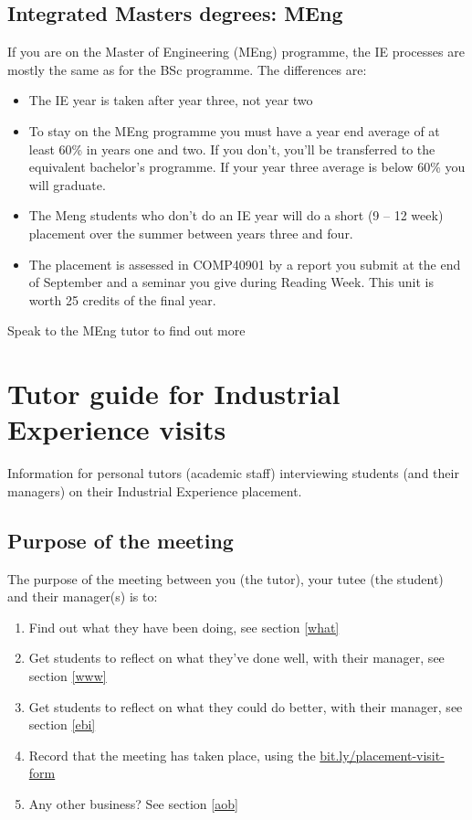 \documentclass[
]{book}
\providecommand{\tightlist}{%
  \setlength{\itemsep}{0pt}\setlength{\parskip}{0pt}}
\begin{document}
\section{Integrated Masters degrees: MEng}\label{meng}

If you are on the Master of Engineering (MEng) programme, the IE processes are mostly the same as for the BSc programme. The differences are:

\begin{itemize}
\tightlist
\item
  The IE year is taken after year three, not year two
\item
  To stay on the MEng programme you must have a year end average of at least 60\% in years one and two. If you don't, you'll be transferred to the equivalent bachelor's programme. If your year three average is below 60\% you will graduate.
\item
  The Meng students who don't do an IE year will do a short (9 -- 12 week) placement over the summer between years three and four.
\item
  The placement is assessed in COMP40901 by a report you submit at the end of September and a seminar you give during Reading Week. This unit is worth 25 credits of the final year.
\end{itemize}

Speak to the MEng tutor to find out more

\chapter{Tutor guide for Industrial Experience visits}\label{tutors}

Information for personal tutors (academic staff) interviewing students (and their managers) on their Industrial Experience placement.

\section{Purpose of the meeting}\label{purpose}

The purpose of the meeting between you (the tutor), your tutee (the student) and their manager(s) is to:

\begin{enumerate}
\def\labelenumi{\arabic{enumi}.}
\tightlist
\item
  Find out what they have been doing, see section \ref{what}
\item
  Get students to reflect on what they've done well, with their manager, see section \ref{www}
\item
  Get students to reflect on what they could do better, with their manager, see section \ref{ebi}
\item
  Record that the meeting has taken place, using the \url{bit.ly/placement-visit-form} \citep{visitform}
\item
  Any other business? See section \ref{aob}
\end{enumerate}
\end{document}

